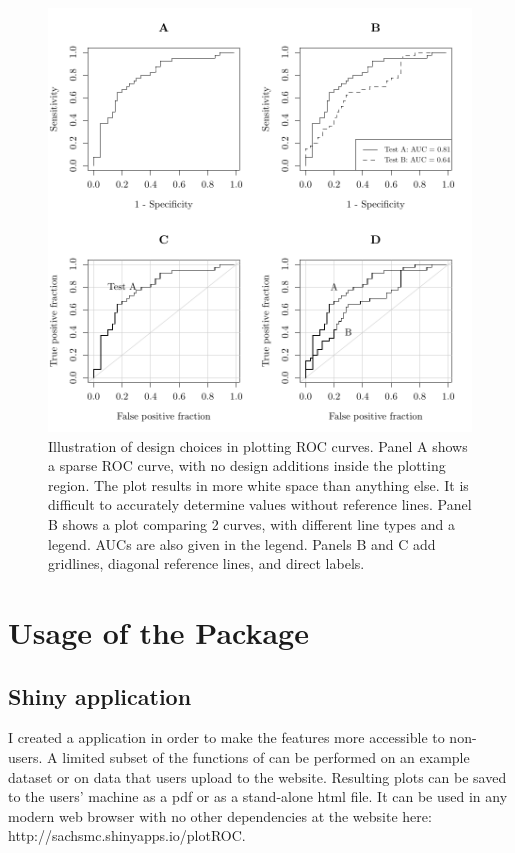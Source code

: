 \documentclass[article]{jss}
\begin{document}
\begin{figure}[htbp]
\centering
\includegraphics{figure/figure1-1.pdf}
\caption{Illustration of design choices in plotting ROC curves. Panel A
shows a sparse ROC curve, with no design additions inside the plotting
region. The plot results in more white space than anything else. It is
difficult to accurately determine values without reference lines. Panel
B shows a plot comparing 2 curves, with different line types and a
legend. AUCs are also given in the legend. Panels B and C add gridlines,
diagonal reference lines, and direct labels. \label{figure1}}
\end{figure}

\section{Usage of the Package}\label{usage-of-the-package}

\subsection{Shiny application}\label{shiny-application}

I created a  application \citep{shiny} in order to make the
features more accessible to non- users. A limited subset of
the functions of  can be performed on an example dataset or
on data that users upload to the website. Resulting plots can be saved
to the users' machine as a pdf or as a stand-alone html file. It can be
used in any modern web browser with no other dependencies at the website
here: http://sachsmc.shinyapps.io/plotROC.
\end{document}

